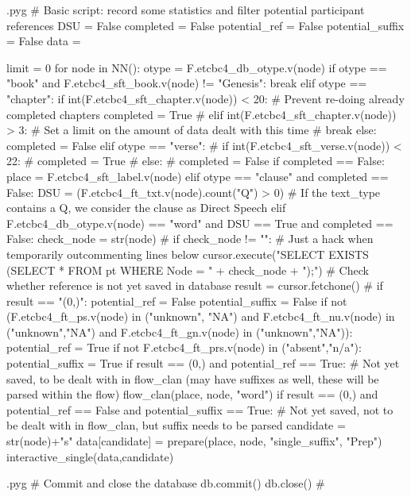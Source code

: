\documentclass{report}
\makeatletter
\newenvironment{python}{%
  \VerbatimEnvironment
  \minted@resetoptions
  \setkeys{minted@opt}{}
      \begin{VerbatimOut}{\jobname.pyg}}
{%
      \end{VerbatimOut}
      \minted@pygmentize{python}
      \DeleteFile{\jobname.pyg}}
\makeatother
\begin{document}
\begin{python}
# Basic script: record some statistics and filter potential participant references
DSU = False
completed = False
potential_ref = False
potential_suffix = False
data = {}

limit = 0
for node in NN():
    otype = F.etcbc4_db_otype.v(node)
    if otype == "book" and F.etcbc4_sft_book.v(node) != "Genesis":
        break
    elif otype == "chapter":
        if int(F.etcbc4_sft_chapter.v(node)) < 20:    # Prevent re-doing already completed chapters
            completed = True
#        elif int(F.etcbc4_sft_chapter.v(node)) > 3:    # Set a limit on the amount of data dealt with this time
#            break
        else:
            completed = False 
    elif otype == "verse":
#        if int(F.etcbc4_sft_verse.v(node)) < 22:
#           completed = True
#        else:
#           completed = False
        if completed == False:
            place = F.etcbc4_sft_label.v(node)
    elif otype == "clause" and completed == False:
        DSU = (F.etcbc4_ft_txt.v(node).count("Q") > 0)    # If the text_type contains a Q, we consider the clause as Direct Speech
    elif F.etcbc4_db_otype.v(node) == "word" and DSU == True and completed == False:
        check_node = str(node)
#        if check_node != "":     # Just a hack when temporarily outcommenting lines below
        cursor.execute("SELECT EXISTS (SELECT * FROM pt WHERE Node = " + check_node + ");") # Check whether reference is not yet saved in database
        result = cursor.fetchone()
#        if result == "(0,)":
        potential_ref = False
        potential_suffix = False
        if not (F.etcbc4_ft_ps.v(node) in ("unknown", "NA") and F.etcbc4_ft_nu.v(node) in ("unknown","NA") and F.etcbc4_ft_gn.v(node) in ("unknown","NA")):
            potential_ref = True
        if not F.etcbc4_ft_prs.v(node) in ("absent","n/a"):
            potential_suffix = True
        if result == (0,) and potential_ref == True: # Not yet saved, to be dealt with in flow_clan (may have suffixes as well, these will be parsed within the flow)
            flow_clan(place, node, "word")
        if result == (0,) and potential_ref == False and potential_suffix == True: # Not yet saved, not to be dealt with in flow_clan, but suffix needs to be parsed
            candidate = str(node)+"s"
            data[candidate] = prepare(place, node, "single_suffix", "Prep")
            interactive_single(data,candidate)

\end{python}

\begin{python}
#{{{ Commit and close the database
db.commit()
db.close()
#}}}
\end{python}
\end{document}
